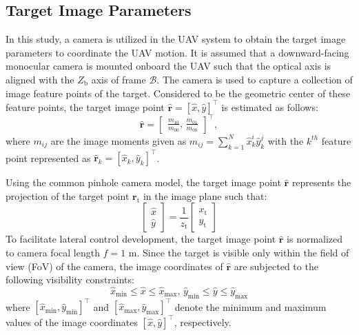 \documentclass[lettersize,journal]{IEEEtran}
\begin{document}
\subsection{Target Image Parameters}
In this study, a camera is utilized in the UAV system to obtain the target image parameters to coordinate the UAV motion.
It is assumed that a downward-facing monocular camera is mounted onboard the UAV such that the optical axis is aligned with the $Z_{\text{b}}$ axis of frame $\mathcal{B}$.
The camera is used to capture a collection of image feature points of the target. Considered to be the geometric center of these feature points, the target image point $\boldsymbol{\hat{r}} = [\hat{x}, \hat{y}]^{\top}$ is estimated as follows:
\begin{equation}
    \boldsymbol{\hat{r}} = \begin{bmatrix} \frac{m_{10}}{m_{00}},\,\frac{m_{01}}{m_{00}} \end{bmatrix}^{\top}, 
\end{equation}
where $m_{ij}$ are the image moments given as $m_{ij} = \sum^{N}_{k=1} \hat{x}_k^i \hat{y}_k^j$ with the $k^{th}$ feature point represented as $\boldsymbol{\hat{r}}_k = [\hat{x}_k, \hat{y}_k]^{\top}$.

Using the common pinhole camera model, the target image point $\boldsymbol{\hat{r}}$ represents the projection of the target point $\boldsymbol{r}_{\text{t}}$ in the image plane such that:
\begin{equation} \label{Eq. (2)}
    \begin{bmatrix} \hat{x} \\ \hat{y}\end{bmatrix}
    = \frac{1}{z_{\text{t}}} \begin{bmatrix} x_{\text{t}} \\ y_{\text{t}}\end{bmatrix}
\end{equation}
To facilitate lateral control development, the target image point $\boldsymbol{\hat{r}}$ is normalized to camera focal length $f = 1$ m. 
Since the target is visible only within the field of view (FoV) of the camera, the image coordinates of $\boldsymbol{\hat{r}}$ are subjected to the following visibility constraints:
\begin{equation} \label{Eq. (3)}
    \hat{x}_{\text{min}} \leq \hat{x} \leq \hat{x}_{\text{max}},\,
    \hat{y}_{\text{min}} \leq \hat{y} \leq \hat{y}_{\text{max}}
\end{equation}
 where $[\hat{x}_{\text{min}}, \hat{y}_{\text{min}}]^{\top}$ and $[\hat{x}_{\text{max}}, \hat{y}_{\text{max}}]^{\top}$ denote the minimum and maximum values of the image coordinates $[\hat{x}, \hat{y}]^{\top}$, respectively.
\end{document}
